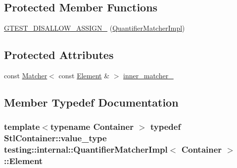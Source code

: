 \subsection*{Protected Member Functions}
\begin{DoxyCompactItemize}
\item 
\hyperlink{classtesting_1_1internal_1_1QuantifierMatcherImpl_ad57fcd1799e59217fe40c0144ff024f1}{G\+T\+E\+S\+T\+\_\+\+D\+I\+S\+A\+L\+L\+O\+W\+\_\+\+A\+S\+S\+I\+G\+N\+\_\+} (\hyperlink{classtesting_1_1internal_1_1QuantifierMatcherImpl}{Quantifier\+Matcher\+Impl})
\end{DoxyCompactItemize}
\subsection*{Protected Attributes}
\begin{DoxyCompactItemize}
\item 
const \hyperlink{classtesting_1_1Matcher}{Matcher}$<$ const \hyperlink{classtesting_1_1internal_1_1QuantifierMatcherImpl_a6f73e2e5fa853f8b5fdd33d6a1811f9e}{Element} \& $>$ \hyperlink{classtesting_1_1internal_1_1QuantifierMatcherImpl_af0ee2a4697f5cb8e937fd29dd75e2a30}{inner\+\_\+matcher\+\_\+}
\end{DoxyCompactItemize}


\subsection{Member Typedef Documentation}
\subsubsection[{\texorpdfstring{Element}{Element}}]{\setlength{\rightskip}{0pt plus 5cm}template$<$typename Container $>$ typedef Stl\+Container\+::value\+\_\+type {\bf testing\+::internal\+::\+Quantifier\+Matcher\+Impl}$<$ Container $>$\+::{\bf Element}}\hypertarget{classtesting_1_1internal_1_1QuantifierMatcherImpl_a6f73e2e5fa853f8b5fdd33d6a1811f9e}{}\label{classtesting_1_1internal_1_1QuantifierMatcherImpl_a6f73e2e5fa853f8b5fdd33d6a1811f9e}
